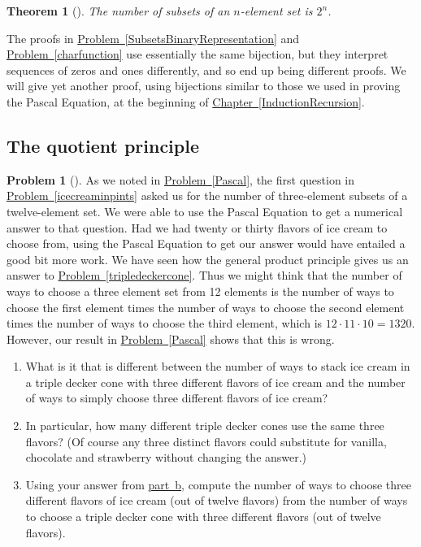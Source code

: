\documentclass[10pt,]{book}
\theoremstyle{plain}
\newtheorem{theorem}{Theorem}[section]
\theoremstyle{definition}
\newtheorem{activity}[project]{Problem}
\theoremstyle{definition}
\numberwithin{equation}{chapter}
\begin{document}
\begin{theorem}[{}]\label{theorem-1}
The number of subsets of an \(n\)-element set is \(2^n\).%
\end{theorem}
The proofs in \hyperref[SubsetsBinaryRepresentation]{Problem~\ref{SubsetsBinaryRepresentation}} and \hyperref[charfunction]{Problem~\ref{charfunction}} use essentially the same bijection, but they interpret sequences of zeros and ones differently, and so end up being different proofs. We will give yet another proof, using bijections similar to those we used in proving the Pascal Equation, at the beginning of \hyperref[InductionRecursion]{Chapter~\ref{InductionRecursion}}.%
\typeout{************************************************}
\typeout{************************************************}
\subsection[{The quotient principle}]{The quotient principle}\label{subsection-6}
\begin{activity}[] \label{twelvechoosethree}
As we noted in \hyperref[Pascal]{Problem~\ref{Pascal}}, the first question in \hyperref[icecreaminpints]{Problem~\ref{icecreaminpints}} asked us for the number of three-element subsets of a twelve-element set. We were able to use the Pascal Equation to get a numerical answer to that question. Had we had twenty or thirty flavors of ice cream to choose from, using the Pascal Equation to get our answer would have entailed a good bit more work. We have seen how the general product principle gives us an answer to \hyperref[tripledeckercone]{Problem~\ref{tripledeckercone}}. Thus we might think that the number of ways to choose a three element set from 12 elements is the number of ways to choose the first element times the number of ways to choose the second element times the number of ways to choose the third element, which is \(12\cdot11\cdot10=1320\). However, our result in \hyperref[Pascal]{Problem~\ref{Pascal}} shows that this is wrong.%
\begin{enumerate}[font=\bfseries,label=(\alph*),ref=\alph*]
\item\label{task-35} \marginsymbol[-2.5em]{} What is it that is different between the number of ways to stack ice cream in a triple decker cone with three different flavors of ice cream and the number of ways to simply choose three different flavors of ice cream?%
\item\label{twelvechoosethreethree} \marginsymbol[-2.5em]{} In particular, how many different triple decker cones use the same three flavors?  (Of course any three distinct flavors could substitute for vanilla, chocolate and strawberry without changing the answer.)%
\item\label{twelvechoosethreefinal} \marginsymbol[-2.5em]{} Using your answer from \hyperref[twelvechoosethreethree]{part~b}, compute the number of ways to choose three different flavors of ice cream (out of twelve flavors) from the number of ways to choose a triple decker cone with three different flavors (out of twelve  flavors).%
\end{enumerate}
\end{activity}
\end{document}
